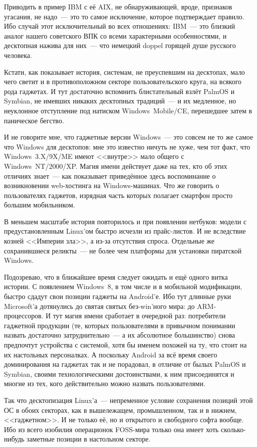 Приводить в пример IBM с её AIX, не обнаруживающей, вроде, признаков угасания, не надо~--- это то самое исключение, которое подтверждает правило. Ибо случай этот исключительный во всех отношениях: IBM~--- это близкий аналог нашего советского ВПК со всеми характерными особенностями, и десктопная нажива для них~--- что немецкий doppel горящей душе русского человека.

Кстати, как показывает история, системам, не преуспевшим на десктопах, мало чего светит и в противоположном секторе пользовательского круга, на всякого рода гаджетах. И тут достаточно вспомнить блистательный взлёт PalmOS и Symbian, не имевших никаких десктопных традиций~--- и их медленное, но неуклонное отступление под натиском Windows~Mobile/CE, перешедшее затем в паническое бегство.

И не говорите мне, что гаджетные версии Windows~--- это совсем не то же самое что Windows для десктопов: мне это известно ничуть не хуже, чем тот факт, что Windows~3.X/9X/ME имеют <<внутре>> мало общего с Windows~NT/2000/XP. Магия имени действует даже на тех, кто об этих отличиях знает~--- как показывает приведённое здесь воспоминание о возникновении web-хостинга на Windows-машинах. Что же говорить о пользователях гаджетов, изрядная часть которых полагает смартфон просто большим мобильником.

В меньшем масштабе история повторилось и при появлении нетбуков: модели с предустановленным Linux'ом быстро исчезли из прайс-листов. И не вследствие козней <<Империи зла>>, а из-за отсутствия спроса. Отдельные же сохранившиеся реликты~--- не более чем платформы для установки пиратской Windows.

Подозреваю, что в ближайшее время следует ожидать и ещё одного витка истории. С появлением Windows~8, в том числе и в мобильной модификации, быстро сдадут свои позиции гаджеты на Android'е. Ибо тут длинные руки Microsoft'а дотянулись до святая святых без-win'ного мира: до ARM-процессоров. И тут магия имени сработает в очередной раз: потребители гаджетной продукции (те, которых пользователями в привычном понимании назвать достаточно затруднительно~--- а их абсолютное большинство) снова предпочтут устройства с системой, хотя бы именем похожей на ту, что стоит на их настольных персоналках. А поскольку Android за всё время своего доминирования на гаджетах так и не порадовал, в отличие от былых PalmOS и Symbian, своими технологическими достоинствами, к ним присоединятся и многие из тех, кого действительно можно назвать пользователями.

Так что десктопизация Linux'а~--- непременное условие сохранения позиций этой ОС в обоих секторах, как в вышележащем, промышленном, так и в нижнем, <<гаджетном>>. И не только её, но и открытого и свободного софта вообще. Ибо из всего изобилия операционок FOSS-мира только она имеет хоть сколько-нибудь заметные позиции в настольном секторе.

